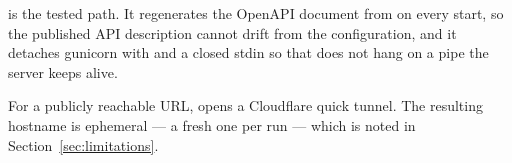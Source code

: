  is the tested path. It regenerates the OpenAPI
document from  on every start, so the published API
description cannot drift from the configuration, and it detaches gunicorn with
 and a closed stdin so that 
does not hang on a pipe the server keeps alive.

For a publicly reachable URL,  opens a
Cloudflare quick tunnel. The resulting hostname is ephemeral --- a fresh one
per run --- which is noted in Section~\ref{sec:limitations}.
